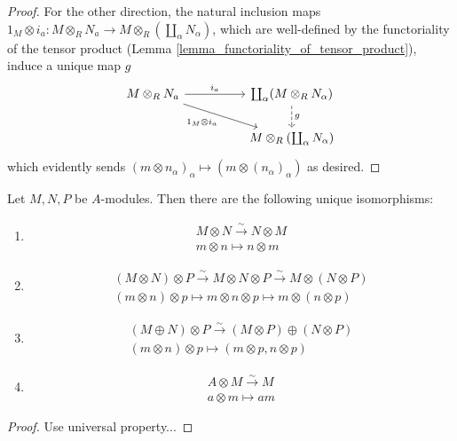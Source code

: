 \documentclass[12pt]{article}
\begin{document}
\begin{proof}
	For the other direction, the natural inclusion maps $1_M\otimes i_a: M\otimes_R N_a \to M\otimes_R (\coprod_\alpha N_\alpha)$, which are well-defined by the functoriality of the tensor product (Lemma \ref{lemma_functoriality_of_tensor_product}), induce a unique map $g$
	\begin{equation*}
\begin{tikzcd}
M\otimes_R N_a \arrow[rr, "i_a"] \arrow[rrd, "1_M\otimes i_a"'] &  & \coprod_\alpha(M\otimes_R N_\alpha) \arrow[d, "g", dashed] \\
                                                                &  & M\otimes_R (\coprod_\alpha N_\alpha)                      
\end{tikzcd}
	\end{equation*}
	which evidently sends $(m\otimes n_\alpha)_\alpha \mapsto (m\otimes (n_\alpha)_\alpha)$ as desired.
\end{proof}

\begin{proposition}
	Let $M,N,P$ be $A$-modules. Then there are the following unique isomorphisms:
	\begin{enumerate}
		\item 
			\begin{gather*}
				M\otimes N \overset{\sim}{\to} N\otimes M \\
				m\otimes n \mapsto n\otimes m
			\end{gather*}
		\item 
			\begin{gather*}
				(M\otimes N)\otimes P \overset{\sim}{\to} M\otimes N\otimes P \overset{\sim}{\to} M\otimes (N\otimes P) \\
				(m\otimes n)\otimes p \mapsto m\otimes n\otimes p \mapsto m\otimes(n\otimes p)
			\end{gather*}
		\item 
			\begin{gather*}
				(M\oplus N)\otimes P \overset{\sim}{\to} (M\otimes P)\oplus (N\otimes P) \\
				(m\otimes n)\otimes p\mapsto (m\otimes p, n\otimes p)
			\end{gather*}
		\item 
			\begin{gather*}
				A\otimes M \overset{\sim}{\to} M \\
				a\otimes m \mapsto am
			\end{gather*}
	\end{enumerate}
\end{proposition}
\begin{proof}
	Use universal property... 
\end{proof}
\end{document}
